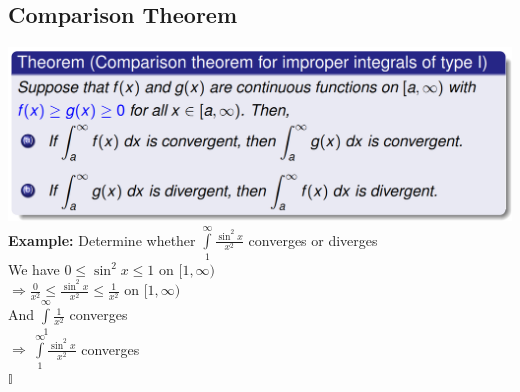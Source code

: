 \documentclass{article}
\begin{document}
\subsection{Comparison Theorem}
\includegraphics[width=1\linewidth]{compa.png}
\textbf{Example:} Determine whether $\displaystyle\int\limits_{1}^{\infty}\frac{\sin^2x}{x^2}$ converges or diverges\\
We have $0\leq \sin^2x\leq 1$ on $[1,\infty)$\\
$\Rightarrow \displaystyle\frac{0}{x^2}\leq \frac{\sin^2x}{x^2}\leq\frac{1}{x^2}$ on $[1,\infty)$\\
And $\displaystyle\int\limits_{1}^{\infty} \frac{1}{x^2}$ converges\\
$\Rightarrow\ \displaystyle\int\limits_{1}^{\infty}\frac{\sin^2x}{x^2}$ converges\\
$\displaystyle\mathbb{I}$
\end{document}
